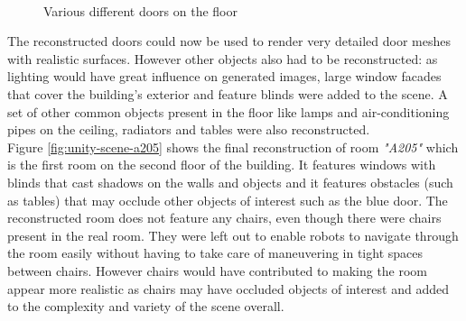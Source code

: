\begin{figure}[htp]
{    }\\%
    \quad
    \caption{Various different doors on the floor}
    \label{fig:doors}
\end{figure}

The reconstructed doors could now be used to render very detailed door meshes with realistic surfaces. However other objects also had to be reconstructed: as lighting would have great influence on generated images, large window facades that cover the building's exterior and feature blinds were added to the scene. A set of other common objects present in the floor like lamps and air-conditioning pipes on the ceiling, radiators and tables were also reconstructed.\\Figure \ref{fig:unity-scene-a205} shows the final reconstruction of room \textit{"A205"} which is the first room on the second floor of the building. It features windows with blinds that cast shadows on the walls and objects and it features obstacles (such as tables) that may occlude other objects of interest such as the blue door. The reconstructed room does not feature any chairs, even though there were chairs present in the real room. They were left out to enable robots to navigate through the room easily without having to take care of maneuvering in tight spaces between chairs. However chairs would have contributed to making the room appear more realistic as chairs may have occluded objects of interest and added to the complexity and variety of the scene overall.

